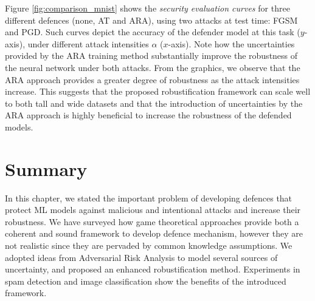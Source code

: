 Figure \ref{fig:comparison_mnist} shows the \emph{security evaluation curves} \cite{BIGGIO2018317} for three different defences (none, AT and ARA), using two attacks at test time: FGSM and PGD. Such curves depict the accuracy of the defender model at this task ($y$-axis), under different attack intensities $\alpha$ ($x$-axis). Note how the uncertainties provided by the ARA training method substantially improve the robustness of the neural network under both attacks. From the graphics, we observe that the ARA approach provides a greater degree of robustness as the attack intensities increase. This suggests that the proposed robustification framework can scale well to both tall and wide datasets and that the introduction of uncertainties by the ARA approach is highly beneficial to increase the robustness of the defended models.





\section{Summary}

In this chapter, we stated the important problem of developing defences that protect ML models against malicious and intentional attacks and increase their robustness. We have surveyed how game theoretical approaches provide both a coherent and sound framework to develop defence mechanism, however they are not realistic since they are pervaded by common knowledge assumptions. We adopted ideas from Adversarial Risk Analysis to model several sources of uncertainty, and proposed an enhanced robustification method. Experiments in spam detection and image classification show the benefits of the introduced framework.